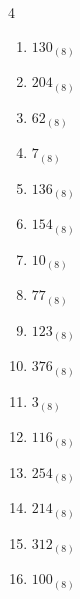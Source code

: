 \begin{multicols}{4}
\begin{enumerate}
  \item $130_{(8)}$

        \phantom{$=88$}

  \item $204_{(8)}$

        \phantom{$=132$}

  \item $62_{(8)}$

        \phantom{$=50$}

  \item $7_{(8)}$

        \phantom{$=7$}

  \item $136_{(8)}$

        \phantom{$=94$}

  \item $154_{(8)}$

        \phantom{$=108$}

  \item $10_{(8)}$

        \phantom{$=8$}

  \item $77_{(8)}$

        \phantom{$=63$}

  \item $123_{(8)}$

        \phantom{$=83$}

  \item $376_{(8)}$

        \phantom{$=254$}

  \item $3_{(8)}$

        \phantom{$=3$}

  \item $116_{(8)}$

        \phantom{$=78$}

  \item $254_{(8)}$

        \phantom{$=172$}

  \item $214_{(8)}$

        \phantom{$=140$}

\columnbreak %

\resetques

  \item $312_{(8)}$

        \phantom{$=202$}

  \item $100_{(8)}$


\end{enumerate}
\end{multicols}
